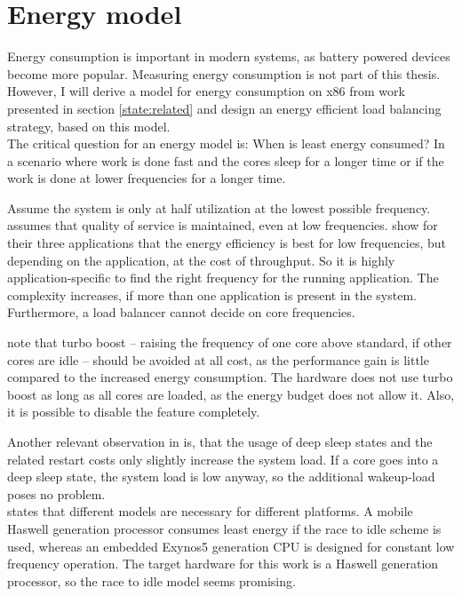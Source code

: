 \section{Energy model}
\label{design:energy}

Energy consumption is important in modern systems, as battery powered devices
become more popular.
Measuring energy consumption is not part of this thesis.
However, I will derive a model for energy consumption on x86 from work presented
in section \ref{state:related} and design an energy efficient load balancing
strategy, based on this model.
\\

The critical question for an energy model is:
When is least energy consumed?
In a scenario where work is done fast and the cores sleep for a longer time or
if the work is done at lower frequencies for a longer time.

Assume the system is only at half utilization at the lowest possible frequency.
\cite{le_sueur_slow_2011} assumes that quality of service is maintained, even
at low frequencies.
\citeauthor{le_sueur_slow_2011} show for their three applications that the
energy efficiency is best for low frequencies, but depending on the
application, at the cost of throughput.
So it is highly application-specific to find the right frequency for the
running application.
The complexity increases, if more than one application is present in the
system.
Furthermore, a load balancer cannot decide on core frequencies.

\citeauthor{le_sueur_slow_2011} note that turbo boost -- raising the frequency
of one core above standard, if other cores are idle -- should be avoided at
all cost, as the performance gain is little compared to the increased energy
consumption.
The hardware does not use turbo boost as long as all cores are loaded, as the
energy budget does not allow it.
Also, it is possible to disable the feature completely.


Another relevant observation in \cite{le_sueur_slow_2011} is, that the usage
of deep sleep states and the related restart costs only slightly increase the
system load.
If a core goes into a deep sleep state, the system load is low anyway, so the
additional wakeup-load poses no problem.
\\

\cite{imes_poet_2015} states that different models are necessary for different
platforms.
A mobile Haswell generation processor consumes least energy if the race to
idle scheme is used, whereas an embedded Exynos5 generation CPU is designed for
constant low frequency operation.
The target hardware for this work is a Haswell generation processor, so the
race to idle model seems promising.
\\

